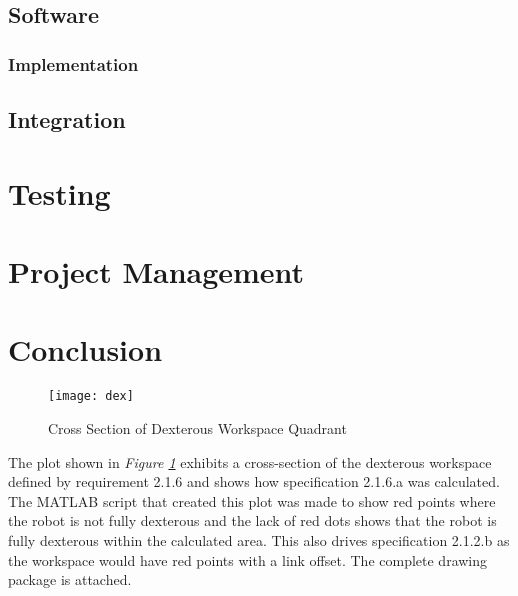 \subsection{Software}

\subsubsection{Implementation}

\subsection{Integration}

\section{Testing}

\section{Project Management}

\section{Conclusion}


\nocite{*}

\raggedright
\titlespacing*{\chapter}{0pt}{-10pt}{40pt}
\newpage
\newpage
\appendix
\renewcommand\thesection{\Roman{section}}
\renewcommand\thesubsection{\roman{subsection}}
\label{sec:app}
\begin{figure}[htp]
  \centering
  \texttt{[image: dex]}
  \caption{Cross Section of Dexterous Workspace Quadrant}
  \label{fig:dex2}
\end{figure}
The plot shown in \emph{Figure \ref{fig:dex2}} exhibits a cross-section of the dexterous workspace defined by requirement 2.1.6 and shows how specification 2.1.6.a was calculated. The MATLAB script that created this plot was made to show red points where the robot is not fully dexterous and the lack of red dots shows that the robot is fully dexterous within the calculated area. This also drives specification 2.1.2.b as the workspace would have red points with a link offset.\newpage
{}
The complete drawing package is attached.



\vspace{10ex}

